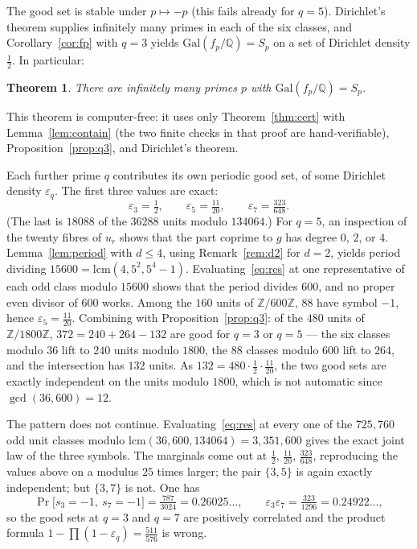\documentclass[11pt,a4paper]{amsart}
\newcommand{\Q}{\mathbb{Q}}
\newcommand{\Z}{\mathbb{Z}}
\newcommand{\Gal}{\mathrm{Gal}}
\theoremstyle{plain}
\newtheorem{theorem}{Theorem}
\theoremstyle{definition}
\begin{document}
The good set is stable under \(p\mapsto-p\) (this fails already for \(q=5\)). Dirichlet's theorem supplies infinitely many primes in each of the six classes, and Corollary~\ref{cor:fp} with \(q=3\) yields \(\Gal(f_p/\Q)=S_p\) on a set of Dirichlet density \(\tfrac12\). In particular:

\begin{theorem}
\label{thm:inf}
There are infinitely many primes \(p\) with \(\Gal(f_p/\Q)=S_p\).
\end{theorem}

This theorem is computer-free: it uses only Theorem~\ref{thm:cert} with Lemma~\ref{lem:contain} (the two finite checks in that proof are hand-verifiable), Proposition~\ref{prop:q3}, and Dirichlet's theorem.

Each further prime \(q\) contributes its own periodic good set, of some Dirichlet density \(\varepsilon_q\). The first three values are exact:
\[
\varepsilon_3=\tfrac12,\qquad\varepsilon_5=\tfrac{11}{20},\qquad\varepsilon_7=\tfrac{323}{648}.
\]
(The last is \(18088\) of the \(36288\) units modulo \(134064\).) For \(q=5\), an inspection of the twenty fibres of \(u_r\) shows that the part coprime to \(g\) has degree \(0\), \(2\), or \(4\). Lemma~\ref{lem:period} with \(d\le4\), using Remark~\ref{rem:d2} for \(d=2\), yields period dividing \(15600=\mathrm{lcm}(4,5^2,5^4-1)\). Evaluating~\eqref{eq:res} at one representative of each odd class modulo \(15600\) shows that the period divides \(600\), and no proper even divisor of \(600\) works. Among the \(160\) units of \(\Z/600\Z\), \(88\) have symbol \(-1\), hence \(\varepsilon_5=\tfrac{11}{20}\). Combining with Proposition~\ref{prop:q3}: of the \(480\) units of \(\Z/1800\Z\), \(372=240+264-132\) are good for \(q=3\) or \(q=5\) --- the six classes modulo \(36\) lift to \(240\) units modulo \(1800\), the \(88\) classes modulo \(600\) lift to \(264\), and the intersection has \(132\) units. As \(132=480\cdot\tfrac12\cdot\tfrac{11}{20}\), the two good sets are exactly independent on the units modulo \(1800\), which is not automatic since \(\gcd(36,600)=12\).

The pattern does not continue. Evaluating~\eqref{eq:res} at every one of the \(725{,}760\) odd unit classes modulo \(\mathrm{lcm}(36,600,134064)=3{,}351{,}600\) gives the exact joint law of the three symbols. The marginals come out at \(\tfrac12\), \(\tfrac{11}{20}\), \(\tfrac{323}{648}\), reproducing the values above on a modulus \(25\) times larger; the pair \(\{3,5\}\) is again exactly independent; but \(\{3,7\}\) is not. One has
\[
\Pr\bigl[s_3=-1,\ s_7=-1\bigr]=\tfrac{787}{3024}=0.26025\ldots,
\qquad
\varepsilon_3\varepsilon_7=\tfrac{323}{1296}=0.24922\ldots,
\]
so the good sets at \(q=3\) and \(q=7\) are positively correlated and the product formula \(1-\prod(1-\varepsilon_q)=\tfrac{511}{576}\) is wrong.
\end{document}
